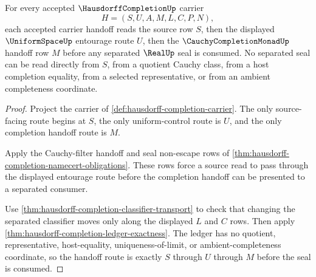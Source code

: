 \begin{theorem}
\label{thm:hausdorff-completion-entourage-filter-coherence}
For every accepted $\HausdorffCompletionUp$ carrier
$$
H=(S,U,A,M,L,C,P,N),
$$
each accepted carrier handoff reads the source row $S$, then the displayed $\UniformSpaceUp$ entourage route $U$, then the $\CauchyCompletionMonadUp$ handoff row $M$ before any separated $\RealUp$ seal is consumed. No separated seal can be read directly from $S$, from a quotient Cauchy class, from a host completion equality, from a selected representative, or from an ambient completeness coordinate.
\end{theorem}
\begin{proof}
Project the carrier of \autoref{def:hausdorff-completion-carrier}. The only source-facing route begins at $S$, the only uniform-control route is $U$, and the only completion handoff route is $M$.

Apply the Cauchy-filter handoff and seal non-escape rows of \autoref{thm:hausdorff-completion-namecert-obligations}. These rows force a source read to pass through the displayed entourage route before the completion handoff can be presented to a separated consumer.

Use \autoref{thm:hausdorff-completion-classifier-transport} to check that changing the separated classifier moves only along the displayed $L$ and $C$ rows. Then apply \autoref{thm:hausdorff-completion-ledger-exactness}. The ledger has no quotient, representative, host-equality, uniqueness-of-limit, or ambient-completeness coordinate, so the handoff route is exactly $S$ through $U$ through $M$ before the seal is consumed.
\end{proof}

